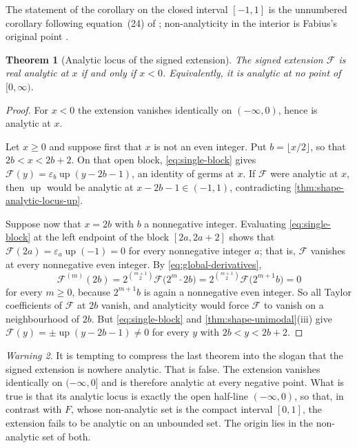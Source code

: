 \documentclass[11pt,oneside]{article}
\newtheorem{theorem}{Theorem}[section]
\theoremstyle{definition}
\theoremstyle{remark}
\newtheorem{warning}[theorem]{Warning}
\newcommand{\Up}{\operatorname{up}}
\begin{document}
The statement of the corollary on the closed interval $[-1,1]$ is the unnumbered corollary
following equation~(24) of \cite{arias2018}; non-analyticity in the interior is Fabius's
original point \cite{fabius1966}.

\begin{theorem}[Analytic locus of the signed extension]
\label{thm:shape-analytic-locus-extension}
The signed extension $\mathcal F$ is real analytic at $x$ if and only if $x<0$.  Equivalently,
it is analytic at no point of $[0,\infty)$.
\end{theorem}

\begin{proof}
For $x<0$ the extension vanishes identically on $(-\infty,0)$, hence is analytic at $x$.

Let $x\ge0$ and suppose first that $x$ is not an even integer.  Put $b=\lfloor x/2\rfloor$, so
that $2b<x<2b+2$.  On that open block, \eqref{eq:single-block} gives
$\mathcal F(y)=\varepsilon_b\Up(y-2b-1)$, an identity of germs at $x$.  If $\mathcal F$ were
analytic at $x$, then $\Up$ would be analytic at $x-2b-1\in(-1,1)$, contradicting
\cref{thm:shape-analytic-locus-up}.

Suppose now that $x=2b$ with $b$ a nonnegative integer.  Evaluating \eqref{eq:single-block} at
the left endpoint of the block $[2a,2a+2]$ shows that $\mathcal F(2a)=\varepsilon_a\Up(-1)=0$
for every nonnegative integer $a$; that is, $\mathcal F$ vanishes at every nonnegative even
integer.  By \eqref{eq:global-derivatives},
\[
 \mathcal F^{(m)}(2b)=2^{\binom{m+1}{2}}\mathcal F\bigl(2^{m}\cdot2b\bigr)
 =2^{\binom{m+1}{2}}\mathcal F\bigl(2^{m+1}b\bigr)=0
\]
for every $m\ge0$, because $2^{m+1}b$ is again a nonnegative even integer.  So all Taylor
coefficients of $\mathcal F$ at $2b$ vanish, and analyticity would force $\mathcal F$ to
vanish on a neighbourhood of $2b$.  But \eqref{eq:single-block} and
\cref{thm:shape-unimodal}(iii) give $\mathcal F(y)=\pm\Up(y-2b-1)\ne0$ for every $y$ with
$2b<y<2b+2$.
\end{proof}

\begin{warning}
It is tempting to compress the last theorem into the slogan that the signed extension is
nowhere analytic.  That is false.  The extension vanishes identically on $(-\infty,0]$ and is
therefore analytic at every negative point.  What is true is that its analytic locus is
exactly the open half-line $(-\infty,0)$, so that, in contrast with $F$, whose non-analytic set
is the compact interval $[0,1]$, the extension fails to be analytic on an unbounded set.  The
origin lies in the non-analytic set of both.
\end{warning}
\end{document}

